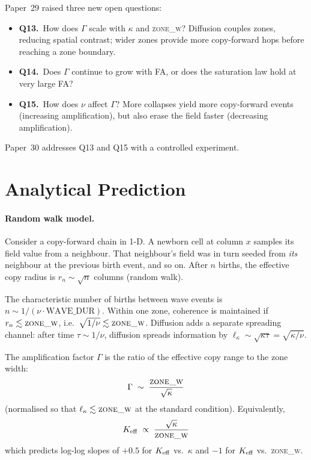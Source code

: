 \documentclass[11pt,a4paper]{article}
\begin{document}
Paper~29 raised three new open questions:
\begin{itemize}
  \item \textbf{Q13.}\ How does $\Gamma$ scale with $\kappa$ and \textsc{zone\_w}?
    Diffusion couples zones, reducing spatial contrast; wider zones provide more
    copy-forward hops before reaching a zone boundary.
  \item \textbf{Q14.}\ Does $\Gamma$ continue to grow with FA, or does the saturation
    law hold at very large FA?
  \item \textbf{Q15.}\ How does $\nu$ affect $\Gamma$?  More collapses yield more
    copy-forward events (increasing amplification), but also erase the field faster
    (decreasing amplification).
\end{itemize}

Paper~30 addresses Q13 and Q15 with a controlled experiment.

\section{Analytical Prediction}
\label{sec:theory}

\paragraph{Random walk model.}
Consider a copy-forward chain in 1-D.  A newborn cell at column $x$ samples its
field value from a neighbour.  That neighbour's field was in turn seeded from
\emph{its} neighbour at the previous birth event, and so on.  After $n$ births, the
effective copy radius is $r_n \sim \sqrt{n}$ columns (random walk).

The characteristic number of births between wave events is $n \sim 1/(\nu \cdot
\mathrm{WAVE\_DUR})$.  Within one zone, coherence is maintained if $r_n \lesssim
\textsc{zone\_w}$, i.e.\ $\sqrt{1/\nu} \lesssim \textsc{zone\_w}$.
Diffusion adds a separate spreading channel: after time $\tau \sim 1/\nu$, diffusion
spreads information by $\ell_\kappa \sim \sqrt{\kappa \tau} = \sqrt{\kappa/\nu}$.

The amplification factor $\Gamma$ is the ratio of the effective copy range to the
zone width:
\begin{equation}
\Gamma \;\sim\; \frac{\textsc{zone\_w}}{\sqrt{\kappa}}
\label{eq:gamma_pred}
\end{equation}
(normalised so that $\ell_\kappa \lesssim \textsc{zone\_w}$ at the standard condition).
Equivalently,
\begin{equation}
K_{\rm eff} \;\propto\; \frac{\sqrt{\kappa}}{\textsc{zone\_w}}
\label{eq:keff_pred}
\end{equation}
which predicts log-log slopes of $+0.5$ for $K_{\rm eff}$ vs.\ $\kappa$ and $-1$ for
$K_{\rm eff}$ vs.\ \textsc{zone\_w}.
\end{document}

